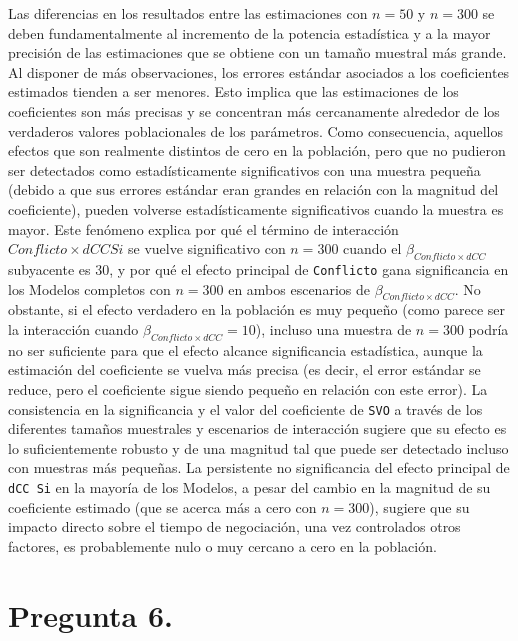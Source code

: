\documentclass[
  spanish,
  10pt,
]{article}
\begin{document}
Las diferencias en los resultados entre las estimaciones con \(n=50\) y
\(n=300\) se deben fundamentalmente al incremento de la potencia
estadística y a la mayor precisión de las estimaciones que se obtiene
con un tamaño muestral más grande. Al disponer de más observaciones, los
errores estándar asociados a los coeficientes estimados tienden a ser
menores. Esto implica que las estimaciones de los coeficientes son más
precisas y se concentran más cercanamente alrededor de los verdaderos
valores poblacionales de los parámetros. Como consecuencia, aquellos
efectos que son realmente distintos de cero en la población, pero que no
pudieron ser detectados como estadísticamente significativos con una
muestra pequeña (debido a que sus errores estándar eran grandes en
relación con la magnitud del coeficiente), pueden volverse
estadísticamente significativos cuando la muestra es mayor. Este
fenómeno explica por qué el término de interacción
\(Conflicto \times dCC Si\) se vuelve significativo con \(n=300\) cuando
el \(\beta_{Conflicto \times dCC}\) subyacente es 30, y por qué el
efecto principal de \texttt{Conflicto} gana significancia en los Modelos
completos con \(n=300\) en ambos escenarios de
\(\beta_{Conflicto \times dCC}\). No obstante, si el efecto verdadero en
la población es muy pequeño (como parece ser la interacción cuando
\(\beta_{Conflicto \times dCC}=10\)), incluso una muestra de \(n=300\)
podría no ser suficiente para que el efecto alcance significancia
estadística, aunque la estimación del coeficiente se vuelva más precisa
(es decir, el error estándar se reduce, pero el coeficiente sigue siendo
pequeño en relación con este error). La consistencia en la significancia
y el valor del coeficiente de \texttt{SVO} a través de los diferentes
tamaños muestrales y escenarios de interacción sugiere que su efecto es
lo suficientemente robusto y de una magnitud tal que puede ser detectado
incluso con muestras más pequeñas. La persistente no significancia del
efecto principal de \texttt{dCC\ Si} en la mayoría de los Modelos, a
pesar del cambio en la magnitud de su coeficiente estimado (que se
acerca más a cero con \(n=300\)), sugiere que su impacto directo sobre
el tiempo de negociación, una vez controlados otros factores, es
probablemente nulo o muy cercano a cero en la población.

\newpage

\section{Pregunta 6.}\label{pregunta-6.}
\end{document}
